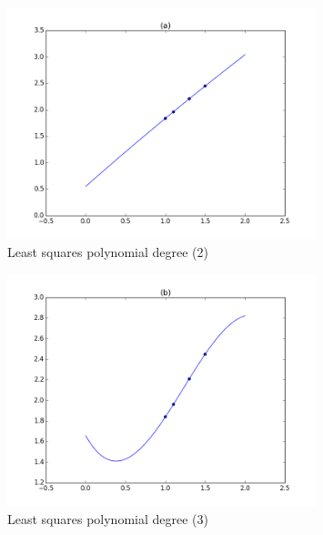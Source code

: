 \documentclass[10pt]{article}
\theoremstyle{plain}
\theoremstyle{definition}
\numberwithin{equation}{section}
\begin{document}
\begin{figure}[p]
    \begin{center}
        \includegraphics[width=0.8\textwidth]{p1_2}
        \caption{Least squares polynomial degree (2)}
    \end{center}
\end{figure}

\begin{figure}[p]
    \begin{center}
        \includegraphics[width=0.8\textwidth]{p1_3}
        \caption{Least squares polynomial degree (3)}
    \end{center}
\end{figure}
\end{document}
